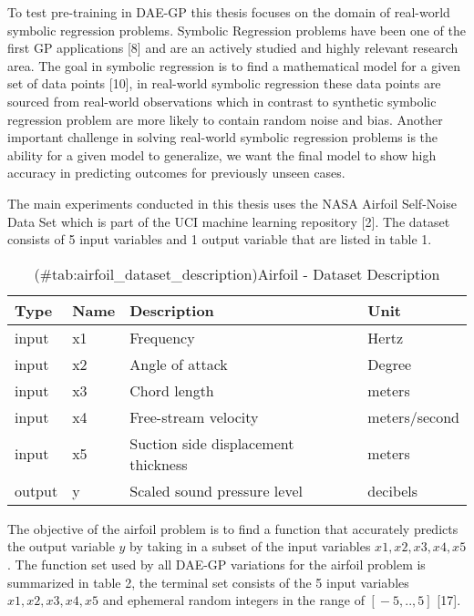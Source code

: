 \documentclass[
  11pt,
]{article}
\begin{document}
To test pre-training in DAE-GP this thesis focuses on the domain of real-world symbolic regression problems. Symbolic Regression problems have been one of the first GP applications {[}8{]} and are an actively studied and highly relevant research area. The goal in symbolic regression is to find a mathematical model for a given set of data points {[}10{]}, in real-world symbolic regression these data points are sourced from real-world observations which in contrast to synthetic symbolic regression problem are more likely to contain random noise and bias. Another important challenge in solving real-world symbolic regression problems is the ability for a given model to generalize, we want the final model to show high accuracy in predicting outcomes for previously unseen cases.

The main experiments conducted in this thesis uses the NASA Airfoil Self-Noise Data Set which is part of the UCI machine learning repository {[}2{]}. The dataset consists of 5 input variables and 1 output variable that are listed in table 1.

\begin{table}[!h]

\caption{(\#tab:airfoil_dataset_description)Airfoil - Dataset Description}
\centering
\begin{tabular}[t]{l|l|l|l}
\hline
\textbf{Type} & \textbf{Name} & \textbf{Description} & \textbf{Unit}\\
\hline
input & x1 & Frequency & Hertz\\
\hline
input & x2 & Angle of attack & Degree\\
\hline
input & x3 & Chord length & meters\\
\hline
input & x4 & Free-stream velocity & meters/second\\
\hline
input & x5 & Suction side displacement thickness & meters\\
\hline
output & y & Scaled sound pressure level & decibels\\
\hline
\end{tabular}
\end{table}

The objective of the airfoil problem is to find a function that accurately predicts the output variable \(y\) by taking in a subset of the input variables \(x1,x2,x3,x4,x5\). The function set used by all DAE-GP variations for the airfoil problem is summarized in table 2, the terminal set consists of the 5 input variables \(x1,x2,x3,x4,x5\) and ephemeral random integers in the range of \([{}-5,..,5]\) {[}17{]}.
\end{document}
